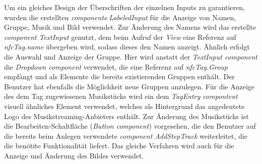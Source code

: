 \documentclass[10pt, a4paper]{article}
\begin{document}
\begin{onehalfspace}
Um ein gleiches Design der Überschriften der einzelnen Inputs zu garantieren, wurden die erstellten \textit{components} \textit{LabeledInput} für die Anzeige von Namen, Gruppe, Musik und Bild verwendet.
Zur Änderung des Namens wird das erstellte \textit{component} \textit{TextInput} genutzt, dem beim Aufruf der \textit{View} eine Referenz auf \textit{nfcTag.name} übergeben wird, sodass dieses den Namen anzeigt.
Ähnlich erfolgt die Auswahl und Anzeige der Gruppe. Hier wird anstatt der \textit{TextInput component} die \textit{Dropdown component} verwendet, die eine Referenz auf \textit{nfcTag.Group} empfängt und als Elemente die bereits existierenden Gruppen enthält.
Der Benutzer hat ebenfalls die Möglichkeit neue Gruppen anzulegen.
Für die Anzeige des dem Tag zugewiesenen Musikstücks wird ein dem \textit{TagEntry compontent} visuell ähnliches Element verwendet, welches als Hintergrund das angedeutete Logo des Musikstreaming-Anbieters enthält.
Zur Änderung des Musikstücks ist die Bearbeiten-Schaltfläche (\textit{Button component}) vorgesehen, die den Benutzer auf die bereits beim Anlegen verwendete \textit{component AddStepTrack} weiterleitet, die die benötite Funktionalität liefert.
Das gleiche Verfahren wird auch für die Anzeige und Änderung des Bildes verwendet.



\end{onehalfspace}
\end{document}
